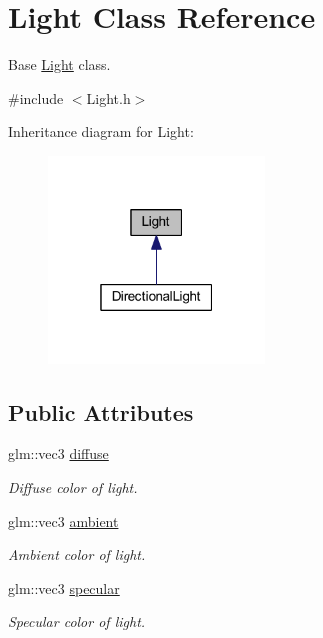 \hypertarget{class_light}{}\section{Light Class Reference}
\label{class_light}


Base \mbox{\hyperlink{class_light}{Light}} class.  




{\ttfamily \#include $<$Light.\+h$>$}



Inheritance diagram for Light\+:\nopagebreak
\begin{figure}[H]
\begin{center}
\leavevmode
\includegraphics[width=163pt]{class_light__inherit__graph}
\end{center}
\end{figure}
\subsection*{Public Attributes}
\begin{DoxyCompactItemize}
\item 
glm\+::vec3 \mbox{\hyperlink{class_light_ad47b5347556fd8cd9ebdc60fdfed196b}{diffuse}}
\begin{DoxyCompactList}\small\item\em Diffuse color of light. \end{DoxyCompactList}\item 
glm\+::vec3 \mbox{\hyperlink{class_light_afaa34bb2efc167adcb2055359fd08a49}{ambient}}
\begin{DoxyCompactList}\small\item\em Ambient color of light. \end{DoxyCompactList}\item 
glm\+::vec3 \mbox{\hyperlink{class_light_aefcfb83a0540ddb885c2622061b28d7e}{specular}}
\begin{DoxyCompactList}\small\item\em Specular color of light. \end{DoxyCompactList}\end{DoxyCompactItemize}


